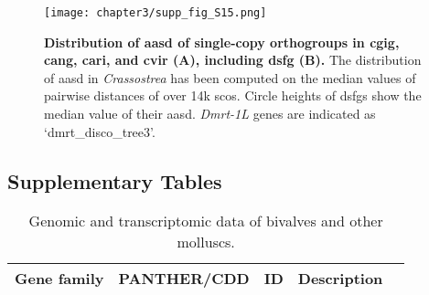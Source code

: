 \documentclass[../main.tex]{subfiles}
\begin{document}
\begin{figure}[ht]
	\centering
	\texttt{[image: chapter3/supp\_fig\_S15.png]}
	\captionsetup{width=\textwidth}
	\caption{
		\textbf{Distribution of \gls{aasd} of single-copy orthogroups in \gls{cgig}, \gls{cang}, \gls{cari}, and \gls{cvir} (A), including \gls{dsfg} (B).} The distribution of \gls{aasd} in \textit{Crassostrea} has been computed on the median values of pairwise distances of over 14k \glspl{sco}. Circle heights of \glspl{dsfg} show the median value of their \gls{aasd}. \textit{Dmrt-1L} genes are indicated as ‘dmrt\_disco\_tree3’.
	}
	\label{suppFig:DSFG_crassostreaDivergence}
\end{figure}

\clearpage

\subsection{Supplementary Tables}

\setcounter{table}{0}
\renewcommand{\tablename}{Supplementary Table}
\renewcommand{\thetable}{S\arabic{chapter}.\arabic{table}}

\begin{landscape}
	\tiny
	\begin{longtable}{@{}cllll@{}}
		\caption{Genomic and transcriptomic data of bivalves and other molluscs.}
		\label{supp_tab:bivalve_dataset}                                                   \\
		\toprule
		\textbf{Gene family} & \textbf{PANTHER/CDD} & \textbf{ID} & \textbf{Description} & \\* \midrule \midrule
	\end{longtable}
\end{landscape}
\end{document}
